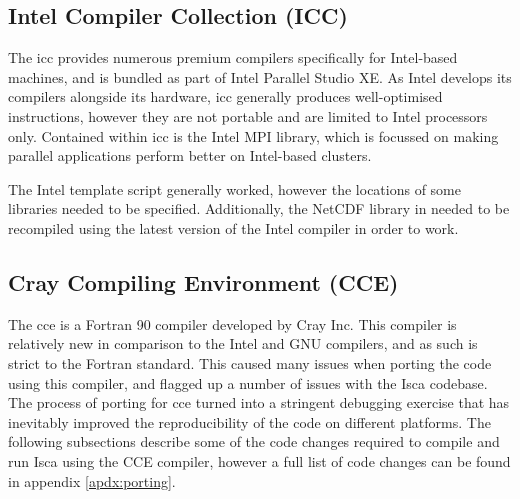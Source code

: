 \documentclass[a4paper,11pt]{report}
\begin{document}
\subsection{Intel Compiler Collection (ICC)}
The \gls{icc} provides numerous premium compilers specifically for Intel-based machines, and is bundled as part of Intel Parallel Studio XE. As Intel develops its compilers alongside its hardware, \gls{icc} generally produces well-optimised instructions, however they are not portable and are limited to Intel processors only. Contained within \gls{icc} is the Intel MPI library, which is focussed on making parallel applications perform better on Intel-based clusters.
\par
The Intel template script generally worked, however the locations of some libraries needed to be specified. Additionally, the NetCDF library in needed to be recompiled using the latest version of the Intel compiler in order to work. 


\subsection{Cray Compiling Environment (CCE)}
The \gls{cce} is a Fortran 90 compiler developed by Cray Inc. This compiler is relatively new in comparison to the Intel and GNU compilers, and as such is strict to the Fortran standard. This caused many issues when porting the code using this compiler, and flagged up a number of issues with the Isca codebase. The process of porting for \gls{cce} turned into a stringent debugging exercise that has inevitably improved the reproducibility of the code on different platforms. The following subsections describe some of the code changes required to compile and run Isca using the CCE compiler, however a full list of code changes can be found in appendix \ref{apdx:porting}.
\end{document}
